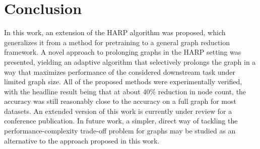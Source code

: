 \section{Conclusion}

In this work, an extension of the HARP algorithm was proposed, which generalizes it from a method for pretraining to a general graph reduction framework. A novel approach to prolonging graphs in the HARP setting was presented, yielding an adaptive algorithm that selectively prolongs the graph in a way that maximizes performance of the considered downstream task under limited graph size. All of the proposed methods were experimentally verified, with the headline result being that at about 40\% reduction in node count, the accuracy was still reasonably close to the accuracy on a full graph for most datasets. An extended version of this work is currently under review for a conference publication. In future work, a simpler, direct way of tackling the performance-complexity trade-off problem for graphs may be studied as an alternative to the approach proposed in this work.
